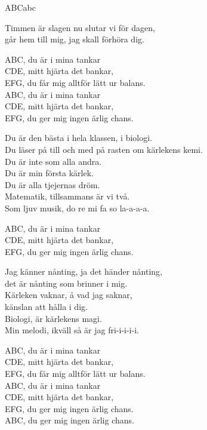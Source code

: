\newpage
\begin{song}{ABC}{abc}
\begin{vers}
Timmen är slagen nu slutar vi för dagen,\\
går hem till mig, jag skall förhöra dig.\\
\end{vers}
\begin{vers}
ABC, du är i mina tankar\\
CDE, mitt hjärta det bankar,\\
EFG, du får mig alltför lätt ur balans.\\
ABC, du är i mina tankar\\
CDE, mitt hjärta det bankar,\\
EFG, du ger mig ingen ärlig chans.\\
\end{vers}
\begin{vers}
Du är den bästa i hela klassen, i biologi.\\
Du läser på till och med på rasten om kärlekens kemi.\\
Du är inte som alla andra.\\
Du är min första kärlek.\\
Du är alla tjejernas dröm.\\
Matematik, tillsammans är vi två.\\
Som ljuv musik, do re mi fa so la-a-a-a.\\
\end{vers}
\begin{vers}
ABC, du är i mina tankar\\
CDE, mitt hjärta det bankar,\\
EFG, du ger mig ingen ärlig chans.\\
\end{vers}
\begin{vers}
Jag känner nånting, ja det händer nånting,\\
det är nånting som brinner i mig.\\
Kärleken vaknar, å vad jag saknar,\\
känslan att hålla i dig.\\
Biologi, är kärlekens magi.\\
Min melodi, ikväll så är jag fri-i-i-i-i.\\
\end{vers}
\begin{vers}
ABC, du är i mina tankar\\
CDE, mitt hjärta det bankar,\\
EFG, du får mig alltför lätt ur balans.\\
ABC, du är i mina tankar\\
CDE, mitt hjärta det bankar,\\
EFG, du ger mig ingen ärlig chans.\\
ABC, du ger mig ingen ärlig chans.\\
\end{vers}
\end{song}

